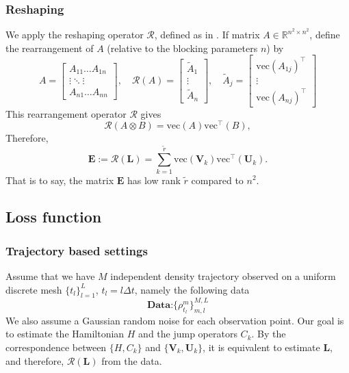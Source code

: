 \documentclass[10pt]{article}  %
\theoremstyle{plain}
\numberwithin{equation}{section}
\def\mR{\mathcal{R}}
\def\R{\mathbb{R}}
\newcommand{\bL}{\mathbf{L}}
\newcommand{\bV}{\mathbf{V}}
\newcommand{\bU}{\mathbf{U}}
\newcommand{\bE}{\mathbf{E}}
\renewcommand{\vec}{\text{vec}}
\begin{document}
\subsubsection{Reshaping}
We apply the reshaping operator $\mR$, defined as in \cite{vanloanApproximationKroneckerProducts1993}. If matrix $A \in \R^{n^2\times n^2}$, define the rearrangement of $A$ (relative to the blocking parameters $n$) by
\begin{equation}
	A = 
	\begin{bmatrix}
 	A_{11} \dots A_{1n}\\
 	\vdots \ddots \vdots\\
 	A_{n1} \dots A_{nn} 
 	\end{bmatrix}, 
 	\quad
	\mR(A) = 
	\begin{bmatrix}
		\widetilde A_1\\ \vdots \\ \widetilde A_{n}	
	\end{bmatrix}
	,\quad 
	\widetilde A_j = 
	\begin{bmatrix}
		\vec(A_{1j})^\top \\ 
		\vdots \\
		\vec(A_{nj})^\top	
	\end{bmatrix}
\end{equation}
This rearrangement operator $\mR$ gives 
\begin{equation}
	\mR(A\otimes B) = \vec(A) \vec^\top(B),
\end{equation}
Therefore, 
\begin{equation}
	\bE := \mR(\bL) = \sum_{k = 1}^{\widetilde{r}} \vec(\bV_k) \vec^\top(\bU_k).
\end{equation}
That is to say, the matrix $\bE$ has low rank $\widetilde{r}$ compared to $n^2$. 

\subsection{Loss function}
\subsubsection{Trajectory based settings}
Assume that we have $M$ independent density trajectory observed on a uniform discrete mesh $\{t_l\}_{l = 1}^L$, $t_l = l \Delta t$, namely the following data
\begin{equation}
	\textbf{Data:} \{\rho^m_{t_l}\}_{m, l}^{M, L}
\end{equation}
We also assume a Gaussian random noise for each observation point. Our goal is to estimate the Hamiltonian $H$ and the jump operators $C_k$. By the correspondence between $\{H, C_k\}$ and $\{\bV_k, \bU_k\}$, it is equivalent to estimate $\bL$, and therefore, $\mR(\bL)$ from the data. 
\end{document}
